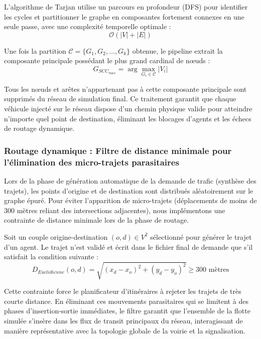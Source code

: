 \documentclass[10pt, a4paper]{article}
\begin{document}
L'algorithme de Tarjan utilise un parcours en profondeur (DFS) pour
identifier les cycles et partitionner le graphe en composantes fortement
connexes en une seule passe, avec une complexité temporelle optimale :
\[\mathcal{O}(|V| + |E|)\]

Une fois la partition \(\mathcal{C} = \{G_1, G_2, \dots, G_k\}\)
obtenue, le pipeline extrait la composante principale possédant le plus
grand cardinal de nœuds :
\[G_{SCC_{max}} = \arg\max_{G_i \in \mathcal{C}} |V_i|\]

Tous les nœuds et arêtes n'appartenant pas à cette composante principale
sont supprimés du réseau de simulation final. Ce traitement garantit que
chaque véhicule injecté sur le réseau dispose d'un chemin physique
valide pour atteindre n'importe quel point de destination, éliminant les
blocages d'agents et les échecs de routage dynamique.

\subsubsection{Routage dynamique : Filtre de distance minimale pour
l'élimination des micro-trajets
parasitaires}\label{routage-dynamique-filtre-de-distance-minimale-pour-luxe9limination-des-micro-trajets-parasitaires}

Lors de la phase de génération automatique de la demande de trafic
(synthèse des trajets), les points d'origine et de destination sont
distribués aléatoirement sur le graphe épuré. Pour éviter l'apparition
de micro-trajets (déplacements de moins de 300 mètres reliant des
intersections adjacentes), nous implémentons une contrainte de distance
minimale lors de la phase de routage.

Soit un couple origine-destination \((o, d) \in V^2\) sélectionné pour
générer le trajet d'un agent. Le trajet n'est validé et écrit dans le
fichier final de demande que s'il satisfait la condition suivante :
\[D_{Euclidienne}(o, d) = \sqrt{(x_d - x_o)^2 + (y_d - y_o)^2} \ge 300 \text{ mètres}\]

Cette contrainte force le planificateur d'itinéraires à rejeter les
trajets de très courte distance. En éliminant ces mouvements
parasitaires qui se limitent à des phases d'insertion-sortie immédiates,
le filtre garantit que l'ensemble de la flotte simulée s'insère dans les
flux de transit principaux du réseau, interagissant de manière
représentative avec la topologie globale de la voirie et la
signalisation.

\newpage
\end{document}
